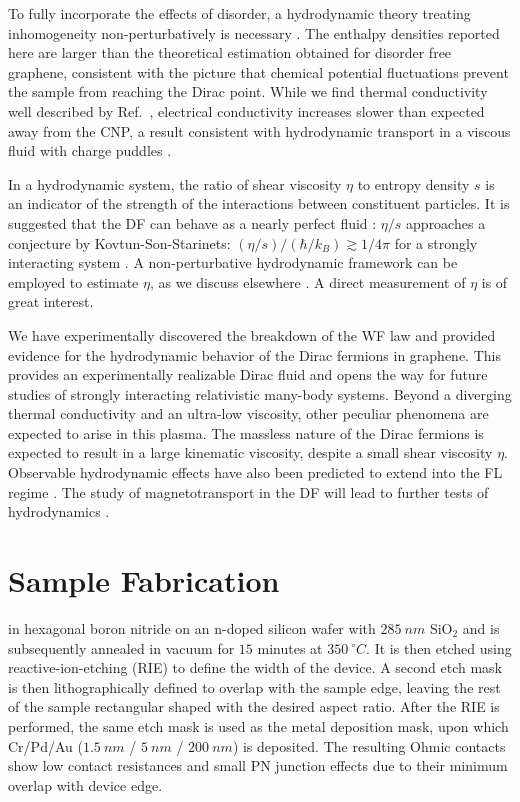 To fully incorporate the effects of disorder, a hydrodynamic theory treating inhomogeneity non-perturbatively is necessary \cite{lucas_hydrodynamic_2015, lucas_transport_2016}. The enthalpy densities reported here are larger than the theoretical estimation obtained for disorder free graphene, consistent with the picture that chemical potential fluctuations prevent the sample from reaching the Dirac point. 
While we find thermal conductivity well described by Ref.~\cite{muller_quantum-critical_2008, foster_slow_2009}, electrical conductivity increases slower than expected away from the CNP, a result consistent with hydrodynamic transport in a viscous fluid with charge puddles \cite{lucas_transport_2016}. 

In a hydrodynamic system, the ratio of shear viscosity $\eta$ to entropy density $s$ is an indicator of the strength of the interactions between constituent particles.   It is suggested that the DF can behave as a nearly perfect fluid \cite{muller_graphene:_2009}: $\eta/s$ approaches a conjecture by Kovtun-Son-Starinets: $(\eta/s)/(\hbar/k_B) \gtrsim 1/4\pi$ for a strongly interacting system \cite{kovtun_viscosity_2005}.  A non-perturbative hydrodynamic framework can be employed to estimate $\eta$, as we discuss elsewhere \cite{lucas_transport_2016}.   A direct measurement of $\eta$ is of great interest. 


We have experimentally discovered the breakdown of the WF law and provided evidence for the hydrodynamic behavior of the Dirac fermions in graphene. This provides an experimentally realizable Dirac fluid and opens the way for future studies of strongly interacting relativistic many-body systems. Beyond a diverging thermal conductivity and an ultra-low viscosity, other peculiar phenomena are expected to arise in this plasma. The massless nature of the Dirac fermions is expected to result in a large kinematic viscosity, despite a small shear viscosity $\eta$.  Observable hydrodynamic effects have also been predicted to extend into the FL regime \cite{principi_bulk_2015}.  The study of magnetotransport in the DF will lead to further tests of hydrodynamics \cite{muller_quantum-critical_2008, hartnoll_theory_2007}.


\section{Sample Fabrication}
 in hexagonal boron nitride on an n-doped silicon wafer with $285~nm$ SiO$_2$ \cite{wang_one-dimensional_2013} and is subsequently annealed in vacuum for $15$ minutes at $350~^\circ C$. It is then etched using reactive-ion-etching (RIE) to define the width of the device. A second etch mask is then lithographically defined to overlap with the sample edge, leaving the rest of the sample rectangular shaped with the desired aspect ratio. After the RIE is performed, the same etch mask is used as the metal deposition mask, upon which Cr/Pd/Au ($1.5~nm$ / $5~nm$ / $200~nm$) is deposited. The resulting Ohmic contacts show low contact resistances and small PN junction effects due to their minimum overlap with device edge. 

